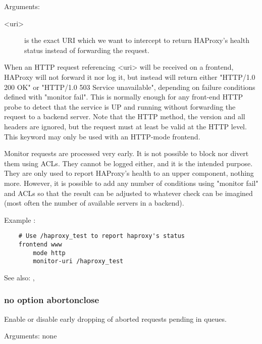   Arguments:
\begin{description}
\item[<uri>]     is the exact URI which we want to intercept to return HAProxy's
              health status instead of forwarding the request.
\end{description}

  When an HTTP request referencing <uri> will be received on a frontend,
  HAProxy will not forward it nor log it, but instead will return either
  "HTTP/1.0 200 OK" or "HTTP/1.0 503 Service unavailable", depending on failure
  conditions defined with "monitor fail". This is normally enough for any
  front-end HTTP probe to detect that the service is UP and running without
  forwarding the request to a backend server. Note that the HTTP method, the
  version and all headers are ignored, but the request must at least be valid
  at the HTTP level. This keyword may only be used with an HTTP-mode frontend.

  Monitor requests are processed very early. It is not possible to block nor
  divert them using ACLs. They cannot be logged either, and it is the intended
  purpose. They are only used to report HAProxy's health to an upper component,
  nothing more. However, it is possible to add any number of conditions using
  "monitor fail" and ACLs so that the result can be adjusted to whatever check
  can be imagined (most often the number of available servers in a backend).

  Example :
\begin{verbatim}
    # Use /haproxy_test to report haproxy's status
    frontend www
        mode http
        monitor-uri /haproxy_test
\end{verbatim}


See also: , 

\subsubsection[abortonclose]{}
\subsubsection*{no option abortonclose}
  
  Enable or disable early dropping of aborted requests pending in queues.

   
  Arguments: none

